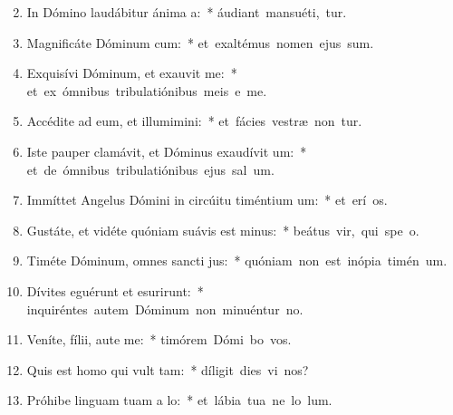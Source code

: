 \begin{flushleft}
\begin{enumerate}[leftmargin=*]
\setcounter{enumi}{1}

\item In Dómino laudábitur ánima a:~* \mbox{áudiant mansuéti,  tur.}

\item Magnificáte Dóminum cum:~* \mbox{et exaltémus nomen ejus  sum.}

\item Exquisívi Dóminum, et exauvit me:~* \mbox{et ex ómnibus tribulatiónibus meis e me.}

\item Accédite ad eum, et illumimini:~* \mbox{et fácies vestræ non tur.}

\item Iste pauper clamávit, et Dóminus exaudívit um:~* \mbox{et de ómnibus tribulatiónibus ejus sal um.}

\item Immíttet Angelus Dómini in circúitu timéntium um:~* \mbox{et erí os.}

\item Gustáte, et vidéte quóniam suávis est minus:~* \mbox{beátus vir, qui spe  o.}

\item Timéte Dóminum, omnes sancti jus:~* \mbox{quóniam non est inópia timén um.}

\item Dívites eguérunt et esurirunt:~* \mbox{inquiréntes autem Dóminum non minuéntur  no.}

\item Veníte, fílii, aute me:~* \mbox{timórem Dómi bo vos.}

\item Quis est homo qui vult tam:~* \mbox{díligit dies vi nos?}

\item Próhibe linguam tuam a lo:~* \mbox{et lábia tua ne lo lum.}


\end{enumerate}
\end{flushleft}
